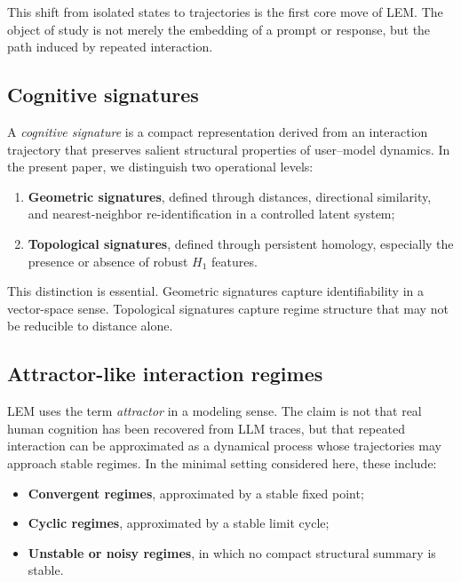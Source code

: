 \documentclass[11pt]{article}
\begin{document}
This shift from isolated states to trajectories is the first core move of LEM. The
object of study is not merely the embedding of a prompt or response, but the path
induced by repeated interaction.

\subsection{Cognitive signatures}

A \emph{cognitive signature} is a compact representation derived from an
interaction trajectory that preserves salient structural properties of user--model
dynamics. In the present paper, we distinguish two operational levels:

\begin{enumerate}[leftmargin=1.8em]
  \item \textbf{Geometric signatures}, defined through distances, directional
        similarity, and nearest-neighbor re-identification in a controlled latent
        system;
  \item \textbf{Topological signatures}, defined through persistent homology,
        especially the presence or absence of robust $H_1$ features.
\end{enumerate}

This distinction is essential. Geometric signatures capture identifiability in a
vector-space sense. Topological signatures capture regime structure that may not
be reducible to distance alone.

\subsection{Attractor-like interaction regimes}

LEM uses the term \emph{attractor} in a modeling sense. The claim is not that real
human cognition has been recovered from LLM traces, but that repeated interaction
can be approximated as a dynamical process whose trajectories may approach stable
regimes. In the minimal setting considered here, these include:

\begin{itemize}[leftmargin=1.8em]
  \item \textbf{Convergent regimes}, approximated by a stable fixed point;
  \item \textbf{Cyclic regimes}, approximated by a stable limit cycle;
  \item \textbf{Unstable or noisy regimes}, in which no compact structural summary
        is stable.
\end{itemize}
\end{document}
